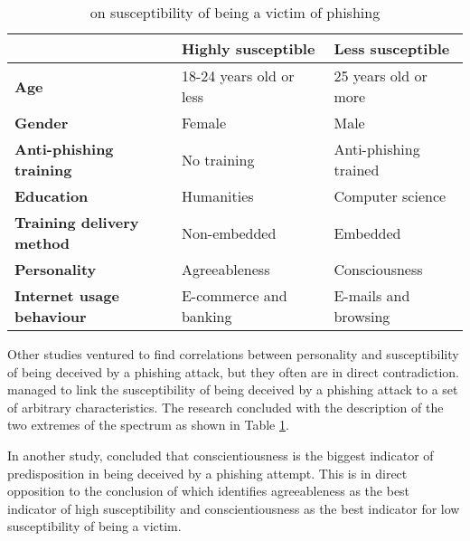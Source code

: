 \small
\begin{table}[b]
	\begin{center}
		\small
		\begin{tabular}{ | m{12em} | m{12em} | m{11.5em} | }
			\hline
			                                  & \textbf{Highly susceptible} & \textbf{Less susceptible} \\
			\hline
			\textbf{Age}                      & 18-24 years old or less     & 25 years old or more      \\
			\hline

			\textbf{Gender}                   & Female                      & Male                      \\
			\hline

			\textbf{Anti-phishing training}   & No training                 & Anti-phishing trained     \\
			\hline

			\textbf{Education}                & Humanities                  & Computer science          \\
			\hline

			\textbf{Training delivery method} & Non-embedded                & Embedded                  \\
			\hline

			\textbf{Personality}              & Agreeableness               & Consciousness             \\
			\hline

			\textbf{Internet usage behaviour} & E-commerce and banking      & E-mails and browsing      \\
			\hline
		\end{tabular}
		\caption{\cite{UNDERSTANDING_PHISHING_VICTIM} on susceptibility of being a victim of phishing}
		\label{tab:VICTIM_SUSCEPTIBILITY_BREAKDOWN}
	\end{center}
\end{table}

Other studies ventured to find correlations between personality and
susceptibility of being deceived by a phishing attack, but they often are in
direct contradiction. \cite{UNDERSTANDING_PHISHING_VICTIM} managed to link the
susceptibility of being deceived by a phishing attack to a set of arbitrary
characteristics. The research concluded with the description of the two extremes
of the spectrum as shown in Table \ref{tab:VICTIM_SUSCEPTIBILITY_BREAKDOWN}.

In another study, \cite{SPEARPHISHING_IN_THE_WILD} concluded that
conscientiousness is the biggest indicator of predisposition in being deceived
by a phishing attempt. This is in direct opposition to the conclusion of
\cite{UNDERSTANDING_PHISHING_VICTIM} which identifies agreeableness as the best
indicator of high susceptibility and conscientiousness as the best indicator for
low susceptibility of being a victim.

